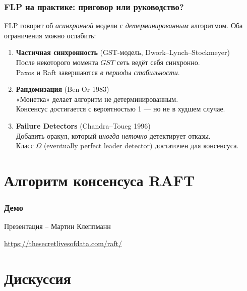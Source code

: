 \documentclass{beamer}
\begin{document}

\begin{frame}
\frametitle{FLP на практике: приговор или руководство?}

FLP говорит об \emph{асинхронной} модели с \emph{детерминированным} алгоритмом.
Оба ограничения можно ослабить:

\vspace{0.3em}
\begin{enumerate}
  \item \textbf{Частичная синхронность} (GST-модель, Dwork--Lynch--Stockmeyer)\\
    \small После некоторого момента $\mathit{GST}$ сеть ведёт себя синхронно.\\
    Paxos и Raft завершаются \emph{в периоды стабильности}.

  \vspace{0.3em}
  \item \textbf{Рандомизация} (Ben-Or 1983)\\
    \small «Монетка» делает алгоритм не детерминированным.\\
    Консенсус достигается с вероятностью 1 --- но не в худшем случае.

  \vspace{0.3em}
  \item \textbf{Failure Detectors} (Chandra--Toueg 1996)\\
    \small Добавить оракул, который \emph{иногда неточно} детектирует отказы.\\
    Класс $\Omega$ (eventually perfect leader detector) достаточен для консенсуса.
\end{enumerate}

\end{frame}

\section{Алгоритм консенсуса RAFT}

\begin{frame}
\frametitle{Демо}

Презентация – Мартин Клеппманн

\href{https://thesecretlivesofdata.com/raft/}{https://thesecretlivesofdata.com/raft/}

\end{frame}

\section{Дискуссия}
\end{document}
